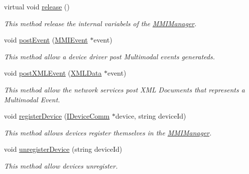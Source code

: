 \begin{DoxyCompactItemize}
\item 
virtual void \hyperlink{classbr_1_1ufscar_1_1lince_1_1mmi_1_1MMIManager_a2e9b5dd15d1c2bd1f34192193c840365}{release} ()
\begin{DoxyCompactList}\small\item\em This method release the internal variabels of the \hyperlink{classbr_1_1ufscar_1_1lince_1_1mmi_1_1MMIManager}{MMIManager}. \item\end{DoxyCompactList}\item 
void \hyperlink{classbr_1_1ufscar_1_1lince_1_1mmi_1_1MMIManager_a140389a1e17ba07406d79a427039ab1b}{postEvent} (\hyperlink{classbr_1_1ufscar_1_1lince_1_1mmi_1_1MMIEvent}{MMIEvent} $\ast$event)
\begin{DoxyCompactList}\small\item\em This method allow a device driver post Multimodal events generateds. \item\end{DoxyCompactList}\item 
void \hyperlink{classbr_1_1ufscar_1_1lince_1_1mmi_1_1MMIManager_ac9208d28d50a1f9e727c34f79d7e23f0}{postXMLEvent} (\hyperlink{structbr_1_1ufscar_1_1lince_1_1mmi_1_1XMLData}{XMLData} $\ast$event)
\begin{DoxyCompactList}\small\item\em This method allow the network services post XML Documents that represents a Multimodal Event. \item\end{DoxyCompactList}\item 
void \hyperlink{classbr_1_1ufscar_1_1lince_1_1mmi_1_1MMIManager_a724f0254692c6dddf2adea7e87286bf5}{registerDevice} (\hyperlink{classbr_1_1ufscar_1_1lince_1_1mmi_1_1IDeviceComm}{IDeviceComm} $\ast$device, string deviceId)
\begin{DoxyCompactList}\small\item\em This method allows devices register themselves in the \hyperlink{classbr_1_1ufscar_1_1lince_1_1mmi_1_1MMIManager}{MMIManager}. \item\end{DoxyCompactList}\item 
void \hyperlink{classbr_1_1ufscar_1_1lince_1_1mmi_1_1MMIManager_a67dfd0985484c895eb0081521835dd7b}{unregisterDevice} (string deviceId)
\begin{DoxyCompactList}\small\item\em This method allow devices unregister. \item\end{DoxyCompactList}\item 

\end{DoxyCompactItemize}
